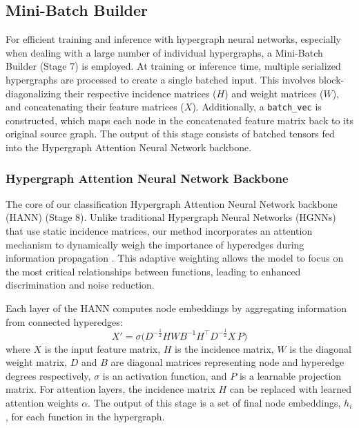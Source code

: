 \documentclass[runningheads]{llncs}
\begin{document}
\subsection{Mini-Batch Builder}
For efficient training and inference with hypergraph neural networks, especially when dealing with a large number of individual hypergraphs, a Mini-Batch Builder (Stage 7) is employed. At training or inference time, multiple serialized hypergraphs are processed to create a single batched input. This involves block-diagonalizing \cite{gao2020hypergraph} their respective incidence matrices ($H$) and weight matrices ($W$), and concatenating their feature matrices ($X$). Additionally, a \texttt{batch\_vec} is constructed, which maps each node in the concatenated feature matrix back to its original source graph. The output of this stage consists of batched tensors fed into the Hypergraph Attention Neural Network backbone.



\subsubsection{Hypergraph Attention Neural Network Backbone}
The core of our classification Hypergraph Attention Neural Network backbone (HANN) (Stage 8). Unlike traditional Hypergraph Neural Networks (HGNNs) that use static incidence matrices, our method incorporates an attention mechanism to dynamically weigh the importance of hyperedges during information propagation \cite{bai2021,khan2025heterogeneous}. This adaptive weighting allows the model to focus on the most critical relationships between functions, leading to enhanced discrimination and noise reduction.

Each layer of the HANN computes node embeddings by aggregating information from connected hyperedges:
$$
X' = \sigma\bigl(D^{-\tfrac12}HWB^{-1}H^{\top}D^{-\tfrac12}X\,P\bigr)
$$
where $X$ is the input feature matrix, $H$ is the incidence matrix, $W$ is the diagonal weight matrix, $D$ and $B$ are diagonal matrices representing node and hyperedge degrees respectively, $\sigma$ is an activation function, and $P$ is a learnable projection matrix. For attention layers, the incidence matrix $H$ can be replaced with learned attention weights $\alpha$. The output of this stage is a set of final node embeddings, $h_i$, for each function in the hypergraph.
\end{document}
